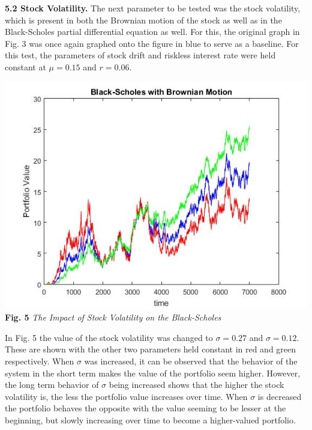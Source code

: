 \documentclass{report}
\begin{document}
	\textbf{5.2 Stock Volatility.} The next parameter to be tested was the stock volatility, which is present in both the Brownian motion of the stock as well as in the Black-Scholes partial differential equation as well. For this, the original graph in Fig. 3 was once again graphed onto the figure in blue to serve as a baseline. For this test, the parameters of stock drift and riskless interest rate were held constant at $\mu=0.15$ and $r=0.06$.
	\begin{center}
		\includegraphics[scale=0.4]{voltalityimpact}
		\\ \textbf{Fig. 5} \textit{The Impact of Stock Volatility on the Black-Scholes}
	\end{center}
	
	In Fig. 5 the value of the stock volatility was changed to $\sigma = 0.27$ and $\sigma = 0.12$. These are shown with the other two parameters held constant in red and green respectively. When $\sigma$ was increased, it can be observed that the behavior of the system in the short term makes the value of the portfolio seem higher. However, the long term behavior of $\sigma$ being increased shows that the higher the stock volatility is, the less the portfolio value increases over time. When $\sigma$ is decreased the portfolio behaves the opposite with the value seeming to be lesser at the beginning, but slowly increasing over time to become a higher-valued portfolio.
	\\
	
\end{document}
